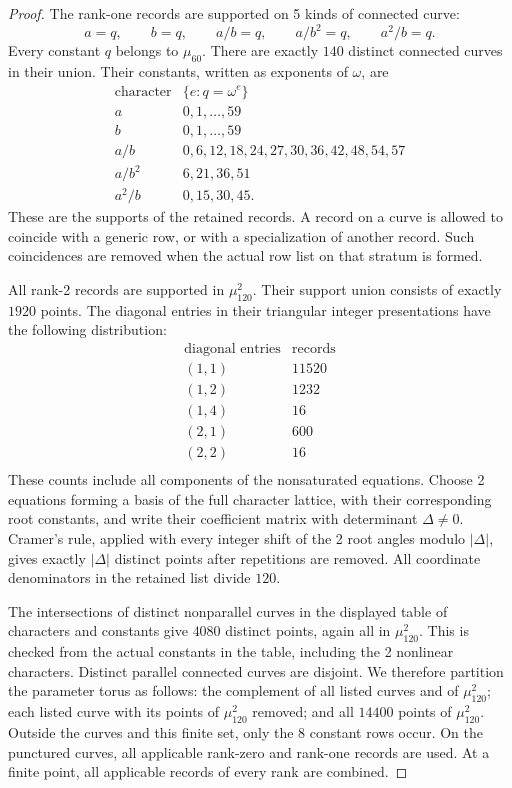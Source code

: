 \documentclass[11pt,a4paper]{article}
\theoremstyle{plain}
\theoremstyle{definition}
\theoremstyle{plain}
\begin{document}
\begin{proof}
\medskip
The rank-one records are supported on 5 kinds of connected curve:
\[
a=q,\qquad b=q,\qquad a/b=q,\qquad a/b^2=q,\qquad a^2/b=q.
\]
Every constant $q$ belongs to $\mu_{60}$. There are exactly $140$ distinct connected curves in their union. Their constants, written as exponents of $\omega$, are
\[
\begin{array}{c|l}
\text{character}&\{e:q=\omega^{e}\}\\\hline
a&0,1,\ldots,59\\
b&0,1,\ldots,59\\
a/b&0,6,12,18,24,27,30,36,42,48,54,57\\
a/b^2&6,21,36,51\\
a^2/b&0,15,30,45.
\end{array}
\]
These are the supports of the retained records. A record on a curve is allowed to coincide with a generic row, or with a specialization of another record. Such coincidences are removed when the actual row list on that stratum is formed.

All rank-2 records are supported in $\mu_{120}^2$. Their support union consists of exactly $1920$ points. The diagonal entries in their triangular integer presentations have the following distribution:
\[
\begin{array}{c|r}
\text{diagonal entries}&\text{records}\\\hline
(1, 1)&11520\\
(1, 2)&1232\\
(1, 4)&16\\
(2, 1)&600\\
(2, 2)&16\\
\end{array}
\]
These counts include all components of the nonsaturated equations. Choose 2 equations forming a basis of the full character lattice, with their corresponding root constants, and write their coefficient matrix with determinant $\Delta\ne0$. Cramer's rule, applied with every integer shift of the 2 root angles modulo $|\Delta|$, gives exactly $|\Delta|$ distinct points after repetitions are removed. All coordinate denominators in the retained list divide $120$.

The intersections of distinct nonparallel curves in the displayed table of characters and constants give $4080$ distinct points, again all in $\mu_{120}^2$. This is checked from the actual constants in the table, including the 2 nonlinear characters. Distinct parallel connected curves are disjoint. We therefore partition the parameter torus as follows: the complement of all listed curves and of $\mu_{120}^2$; each listed curve with its points of $\mu_{120}^2$ removed; and all $14400$ points of $\mu_{120}^2$. Outside the curves and this finite set, only the 8 constant rows occur. On the punctured curves, all applicable rank-zero and rank-one records are used. At a finite point, all applicable records of every rank are combined.


\end{proof}
\end{document}
